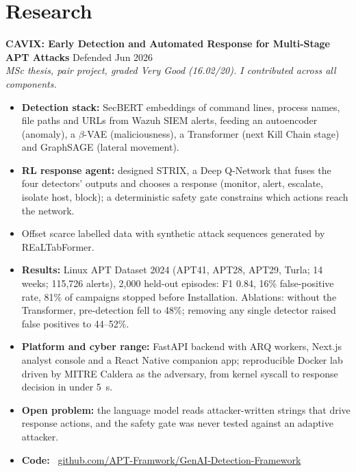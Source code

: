 \documentclass[10pt,a4paper]{article}
\begin{document}
\section*{Research}
\textbf{CAVIX: Early Detection and Automated Response for Multi-Stage APT Attacks} \hfill Defended Jun 2026\\
\textit{MSc thesis, pair project, graded Very Good (16.02/20). I contributed across all components.}
\begin{itemize}
  \item \textbf{Detection stack:} SecBERT embeddings of command lines, process names, file paths and URLs from Wazuh SIEM alerts, feeding an autoencoder (anomaly), a $\beta$-VAE (maliciousness), a Transformer (next Kill Chain stage) and GraphSAGE (lateral movement).
  \item \textbf{RL response agent:} designed STRIX, a Deep Q-Network that fuses the four detectors' outputs and chooses a response (monitor, alert, escalate, isolate host, block); a deterministic safety gate constrains which actions reach the network.
  \item Offset scarce labelled data with synthetic attack sequences generated by REaLTabFormer.
  \item \textbf{Results:} Linux APT Dataset 2024 (APT41, APT28, APT29, Turla; 14 weeks; 115{,}726 alerts), 2{,}000 held-out episodes: F1 0.84, 16\% false-positive rate, 81\% of campaigns stopped before Installation. Ablations: without the Transformer, pre-detection fell to 48\%; removing any single detector raised false positives to 44--52\%.
  \item \textbf{Platform and cyber range:} FastAPI backend with ARQ workers, Next.js analyst console and a React Native companion app; reproducible Docker lab driven by MITRE Caldera as the adversary, from kernel syscall to response decision in under 5~s.
  \item \textbf{Open problem:} the language model reads attacker-written strings that drive response actions, and the safety gate was never tested against an adaptive attacker.
  \item \textbf{Code:} \faGithub~\href{https://github.com/APT-Framwork/GenAI-Detection-Framework}{github.com/APT-Framwork/GenAI-Detection-Framework}
\end{itemize}

\end{document}
